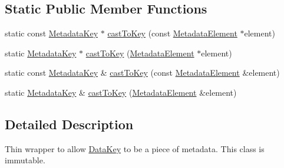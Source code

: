 \subsection*{Static Public Member Functions}
\begin{DoxyCompactItemize}
\item 
static const \hyperlink{classBUSBOY_1_1MetadataKey}{MetadataKey} $\ast$ \hyperlink{classBUSBOY_1_1MetadataKey_ad6cd3c3e919a8f3bffa8df52e04ed1a1}{castToKey} (const \hyperlink{classBUSBOY_1_1MetadataElement}{MetadataElement} $\ast$element)
\item 
static \hyperlink{classBUSBOY_1_1MetadataKey}{MetadataKey} $\ast$ \hyperlink{classBUSBOY_1_1MetadataKey_a4acf5c0d13dd4aace082446e23ceb016}{castToKey} (\hyperlink{classBUSBOY_1_1MetadataElement}{MetadataElement} $\ast$element)
\item 
static const \hyperlink{classBUSBOY_1_1MetadataKey}{MetadataKey} \& \hyperlink{classBUSBOY_1_1MetadataKey_ad0be14983f1088f7b443bca4b21a0101}{castToKey} (const \hyperlink{classBUSBOY_1_1MetadataElement}{MetadataElement} \&element)
\item 
static \hyperlink{classBUSBOY_1_1MetadataKey}{MetadataKey} \& \hyperlink{classBUSBOY_1_1MetadataKey_af2e29faa901c76767d6dea20cfcd7b49}{castToKey} (\hyperlink{classBUSBOY_1_1MetadataElement}{MetadataElement} \&element)
\end{DoxyCompactItemize}


\subsection{Detailed Description}
Thin wrapper to allow \hyperlink{classBUSBOY_1_1DataKey}{DataKey} to be a piece of metadata. This class is immutable. 

